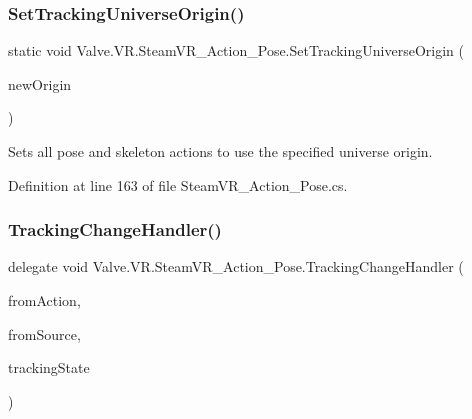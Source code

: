 \subsubsection{\texorpdfstring{SetTrackingUniverseOrigin()}{SetTrackingUniverseOrigin()}}
{\footnotesize\ttfamily static void Valve.\+V\+R.\+Steam\+V\+R\+\_\+\+Action\+\_\+\+Pose.\+Set\+Tracking\+Universe\+Origin (\begin{DoxyParamCaption}\item[{\mbox{\hyperlink{namespace_valve_1_1_v_r_a29be99a3c2f780157bd490db06a7f12f}{E\+Tracking\+Universe\+Origin}}}]{new\+Origin }\end{DoxyParamCaption})\hspace{0.3cm}{\ttfamily [static]}}



Sets all pose and skeleton actions to use the specified universe origin. 



Definition at line 163 of file Steam\+V\+R\+\_\+\+Action\+\_\+\+Pose.\+cs.

\mbox{\label{class_valve_1_1_v_r_1_1_steam_v_r___action___pose_a52e352705659c14685cf8a88ef4bafd6}} 
\subsubsection{\texorpdfstring{TrackingChangeHandler()}{TrackingChangeHandler()}}
{\footnotesize\ttfamily delegate void Valve.\+V\+R.\+Steam\+V\+R\+\_\+\+Action\+\_\+\+Pose.\+Tracking\+Change\+Handler (\begin{DoxyParamCaption}\item[{\mbox{\hyperlink{class_valve_1_1_v_r_1_1_steam_v_r___action___pose}{Steam\+V\+R\+\_\+\+Action\+\_\+\+Pose}}}]{from\+Action,  }\item[{\mbox{\hyperlink{namespace_valve_1_1_v_r_a82e5bf501cc3aa155444ee3f0662853f}{Steam\+V\+R\+\_\+\+Input\+\_\+\+Sources}}}]{from\+Source,  }\item[{\mbox{\hyperlink{namespace_valve_1_1_v_r_abe6feab98f33191b7c27b4292012e90a}{E\+Tracking\+Result}}}]{tracking\+State }\end{DoxyParamCaption})}

\mbox{\label{class_valve_1_1_v_r_1_1_steam_v_r___action___pose_a243e7046a430c572e5be3d1b6b322b6d}} 
